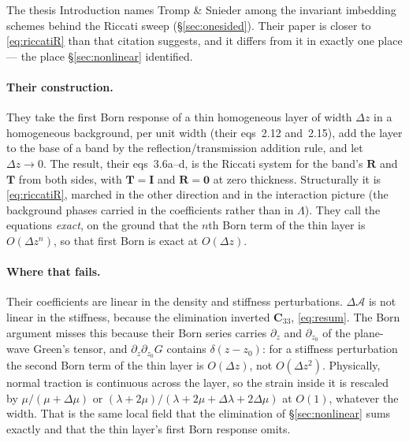 \documentclass[11pt,a4paper]{article}
\newcommand{\bC}{\mathbf{C}}
\newcommand{\dA}{\Delta\mathcal{A}}
\newcommand{\bR}{\mathbf{R}}
\begin{document}
The thesis Introduction names Tromp \& Snieder among the invariant imbedding
schemes behind the Riccati sweep (\S\ref{sec:onesided}).  Their paper
\cite{tromp1989} is closer to \eqref{eq:riccatiR} than that citation suggests,
and it differs from it in exactly one place --- the place \S\ref{sec:nonlinear}
identified.

\paragraph{Their construction.}  They take the first Born response of a thin
homogeneous layer of width $\Delta z$ in a homogeneous background, per unit
width (their eqs~2.12 and~2.15), add the layer to the base of a band by the
reflection/transmission addition rule, and let $\Delta z\to0$.  The result, their
eqs~3.6a--d, is the Riccati system for the band's $\bR$ and $\mathbf{T}$ from
both sides, with $\mathbf{T}=\mathbf{I}$ and $\bR=\mathbf{0}$ at zero thickness.
Structurally it is \eqref{eq:riccatiR}, marched in the other direction and in
the interaction picture (the background phases carried in the coefficients
rather than in $\Lambda$).  They call the equations \emph{exact}, on the ground
that the $n$th Born term of the thin layer is $O(\Delta z^n)$, so that first
Born is exact at $O(\Delta z)$.

\paragraph{Where that fails.}  Their coefficients are linear in the density and
stiffness perturbations.  $\dA$ is not linear in the stiffness, because the
elimination inverted $\bC_{33}$, \eqref{eq:resum}.  The Born argument misses
this because their Born series carries $\partial_z$ and $\partial_{z_0}$ of the
plane-wave Green's tensor, and $\partial_z\partial_{z_0}G$ contains
$\delta(z-z_0)$: for a stiffness perturbation the second Born term of the thin
layer is $O(\Delta z)$, not $O(\Delta z^2)$.  Physically, normal traction is
continuous across the layer, so the strain inside it is rescaled by
$\mu/(\mu+\Delta\mu)$ or $(\lambda+2\mu)/(\lambda+2\mu+\Delta\lambda+2\Delta\mu)$
at $O(1)$, whatever the width.  That is the same local field that the elimination of
\S\ref{sec:nonlinear} sums exactly and that the thin layer's first Born
response omits.
\end{document}

